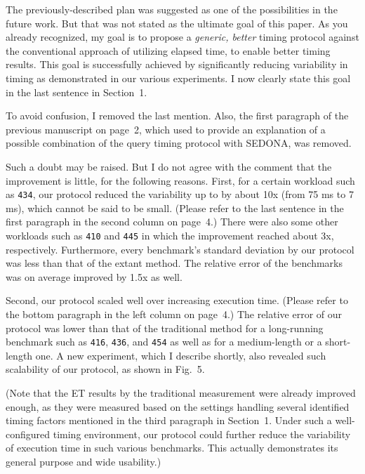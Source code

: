 \documentclass[10pt,letterpaper]{article}
\newenvironment{myindentpar}[1]%
{\begin{list}{}
         {\vspace{10pt}
					\setlength{\leftmargin}{#1}}
          \item[]
}
{\end{list}}
\newcommand{\rev}[1]{\begin{myindentpar}{.25in} {\em {\color{blue}{#1}}}\end{myindentpar}}
\begin{document}
The previously-described plan was suggested as one of the possibilities 
in the future work. But that was not stated as the ultimate goal of this paper. 
As you already recognized, my goal is to propose a {\em generic, better} timing protocol against the 
conventional approach of utilizing elapsed time, 
to enable better timing results. This goal is successfully achieved 
by significantly reducing variability in timing as demonstrated in our various experiments. 
I now clearly state this goal in the last sentence in Section~1. 

To avoid confusion, I removed the last mention. Also, the first paragraph of the previous manuscript on page~2, 
which used to provide an explanation of a possible combination of the query timing protocol 
with SEDONA, was removed.

\rev{
(2) If the proposed approach is for a generic purpose, there is a strong
doubt about usability. The improvement of the SEDONA is little. And the
extent of the each benchmark’s improvement described in Table 3
varies widely. Thus, the experimental results does not confirm whether
the SEDONA is widely practical or is useful. The description to clarify
the SEDONA’s characteristics is needed.
} 

Such a doubt may be raised. But I do not agree with the comment that the improvement is little, 
for the following reasons.
First, for a certain workload such as {\tt 434}, 
our protocol reduced the variability up to by about 10x 
(from 75 ms to 7 ms), 
which cannot be said to be small. (Please refer to the last sentence 
in the first paragraph in the second column on page~4.)
There were also some other workloads such as {\tt 410} and {\tt 445} 
in which the improvement reached about 3x, respectively. 
Furthermore, every benchmark's standard deviation by our protocol 
was less than that of the extant method. 
The relative error of the benchmarks was on average improved 
by 1.5x as well.

Second, our protocol scaled well over increasing execution time. 
(Please refer to the bottom paragraph in the left column on page~4.)
The relative error of our protocol was lower than that of the traditional method 
for a long-running benchmark such as {\tt 416}, {\tt 436}, and {\tt 454} 
as well as for a medium-length or a short-length one. 
A new experiment, 
which I describe shortly, also revealed 
such scalability of our protocol, as shown in Fig.~5.

(Note that the ET results by the traditional measurement were already 
improved enough, as they were measured based 
on the settings handling several identified timing factors mentioned in the third paragraph 
in Section~1. Under such a well-configured timing environment, our protocol could further 
reduce the variability of execution time in such various benchmarks. 
This actually demonstrates its general purpose and wide usability.)
\end{document}
